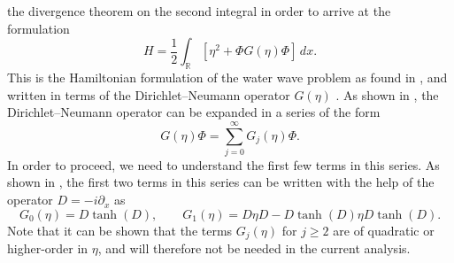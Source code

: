 the divergence theorem on the second integral in order to arrive at
the formulation
%
\begin{equation}
	H  = \frac{1}{2} \int_{\mathbb{R}} \left[ \eta^2 + \Phi G(\eta) \Phi \right] \, dx.
\end{equation}
%
This is the Hamiltonian formulation of the water wave problem as
found in \citep{Craig1993, Petrov1964, Zakharov1968}, and written in terms of the Dirichlet–Neumann
operator $G (\eta)$ . As shown in \cite{Nicholls2001}, the Dirichlet–Neumann operator
can be expanded in a series of the form
%
\[
	G(\eta)\Phi = \sum_{j=0}^\infty G_j(\eta) \Phi
	.
\]
%
In order to proceed, we need to understand the first few terms in
this series. As shown in \citep{Craig1994, Craig1993}, the first two terms in this series
can be written with the help of the operator $D = -i \partial_x$ as
%
\[
	G_0(\eta)= D\tanh(D)
	, \qquad 
	G_1(\eta)= D\eta D - D\tanh(D) \eta D\tanh(D)
	. 
\]
%
Note that it can be shown that the terms $G_j (\eta)$ for $j \geq 2$ are of
quadratic or higher-order in $\eta$, and will therefore not be needed in
the current analysis.


